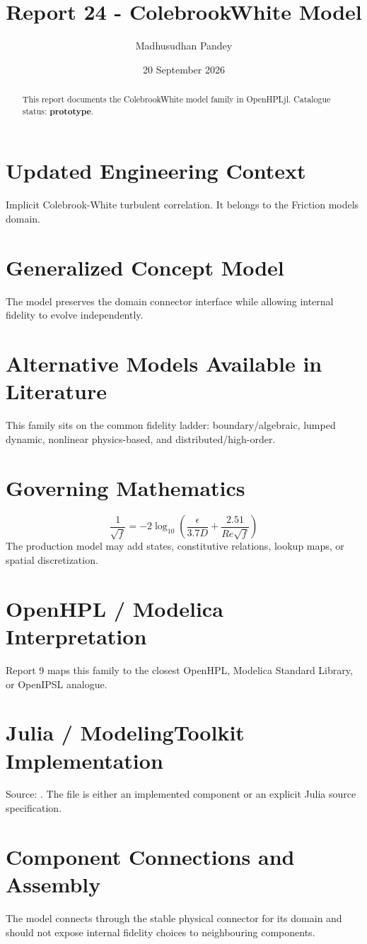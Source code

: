 \documentclass[10pt,a4paper]{article}
\title{Report 24 - ColebrookWhite Model}
\author{Madhusudhan Pandey}
\date{20 September 2026}
\begin{document}
\maketitle
\begin{abstract}This report documents the ColebrookWhite model family in OpenHPLjl. Catalogue status: \textbf{prototype}.\end{abstract}
\section{Updated Engineering Context}Implicit Colebrook-White turbulent correlation. It belongs to the Friction models domain.
\section{Generalized Concept Model}The model preserves the domain connector interface while allowing internal fidelity to evolve independently.
\section{Alternative Models Available in Literature}This family sits on the common fidelity ladder: boundary/algebraic, lumped dynamic, nonlinear physics-based, and distributed/high-order.
\section{Governing Mathematics}\[\frac{1}{\sqrt f}=-2\log_{10}\left(\frac{\epsilon}{3.7D}+\frac{2.51}{Re\sqrt f}\right)\]The production model may add states, constitutive relations, lookup maps, or spatial discretization.
\section{OpenHPL / Modelica Interpretation}Report 9 maps this family to the closest OpenHPL, Modelica Standard Library, or OpenIPSL analogue.
\section{Julia / ModelingToolkit Implementation}Source: \texttt{}. The file is either an implemented component or an explicit Julia source specification.
\section{Component Connections and Assembly}The model connects through the stable physical connector for its domain and should not expose internal fidelity choices to neighbouring components.
\end{document}
